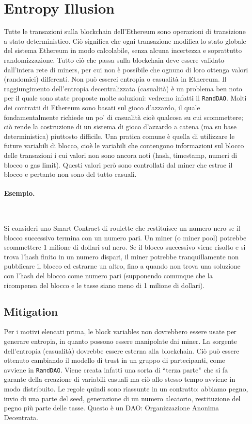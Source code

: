 \section{Entropy Illusion}

Tutte le transazioni sulla blockchain dell'Ethereum sono operazioni di
transizione a stato deterministico. Ciò significa che ogni transazione
modifica lo stato globale del sistema
Ethereum in modo calcolabile, senza alcuna incertezza e soprattutto randomizzazione.
Tutto ciò che passa sulla blockchain deve essere validato dall'intera rete di
miners, per cui non è
possibile che ognuno di loro ottenga valori (randomici) differenti.
Non può esserci entropia o
casualità in Ethereum.
Il raggiungimento dell'entropia decentralizzata (casualità) è un problema ben noto
per il
quale sono state proposte molte soluzioni: vedremo infatti il \verb|RandDAO|.
Molti dei contratti di Ethereum sono basati sul gioco d'azzardo, il quale
fondamentalmente
richiede un po' di casualità cioè qualcosa su cui scommettere;
ciò rende la costruzione di un
sistema di gioco d'azzardo a catena (ma su base deterministica) piuttosto difficile.
Una pratica comune è quella di utilizzare le future variabili di blocco,
cioè le variabili che
contengono informazioni sul blocco delle transazioni i cui valori non sono ancora
noti (hash, timestamp, numeri di blocco o gas limit).
Questi valori però sono controllati dal miner che
estrae il blocco e pertanto non sono del tutto casuali.

\paragraph{Esempio.}\

Si consideri uno Smart Contract di roulette che restituisce un numero nero se il
blocco successivo termina con un numero pari.
Un miner (o miner pool) potrebbe scommettere 1 milione di dollari sul nero.
Se il blocco
successivo viene risolto e si trova l'hash finito in un numero dispari,
il miner potrebbe
tranquillamente non pubblicare il blocco ed estrarne un altro,
fino a quando non trova una
soluzione con l'hash del blocco come numero pari (supponendo comunque che la
ricompensa del blocco e le tasse siano meno di 1 milione di dollari).

\subsection{Mitigation}

Per i motivi elencati prima, le block variables non dovrebbero essere usate per
generare entropia, in
quanto possono essere manipolate dai miner.
La sorgente dell'entropia (casualità) dovrebbe essere esterna alla blockchain.
Ciò può
essere ottenuto cambiando il modello di trust in un gruppo di partecipanti,
come avviene in
\verb|RandDAO|. Viene creata infatti una sorta di ``terza parte'' che si fa garante
della creazione di
variabili casuali ma ciò allo stesso tempo avviene in modo distribuito.
Le regole quindi sono riassunte in un contratto: abbiamo pegno, invio di una parte
del seed,
generazione di un numero aleatorio, restituzione del pegno più parte delle tasse.
Questo è un DAO: Organizzazione Anonima Decentrata.

